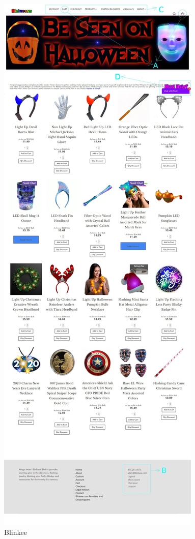 \documentclass[a4paper,11pt,oneside]{scrreprt}
\begin{document}
\begin{figure}[H]
	\includegraphics[clip, trim=0cm 8cm 0cm 117cm, scale=0.33]{./images/blinkee.jpg}
	\caption{Blinkee}
	\label{fig:sub2}
\end{figure}
\end{document}
